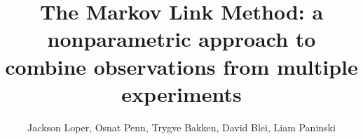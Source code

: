 



\DeclareMathOperator*{\tr}{tr}

\newcommand{\UN}[1]{\ensuremath{\left|#1\right|_\infty}}
\newcommand{\TV}[1]{\ensuremath{\left\Vert #1\right\Vert_{TV}}}
\newcommand{\EN}[1]{\ensuremath{\left|#1\right|}}
\newcommand{\kldiv}[2]{\ensuremath{D\left(#1||#2\right)}}

\newcommand{\figgygr}[2]{\texttt{[image: \#2]}}
\newcommand{\figgygrs}[3]{\begin{tabular}{c}\texttt{[image: \#2]}\\#3\end{tabular}}
\newcommand{\figgygrsTable}[3]{\begin{tabular}{c}{#2}\\#3\end{tabular}}
\newcommand{\figgygrsH}[3]{\begin{tabular}{c}\texttt{[image: \#2]}\\#3\end{tabular}}




\newcommand{\figgy}[1]{\begin{figure}\fbox{\begin{minipage}{\textwidth}#1\end{minipage}}\end{figure}}

\usepackage{cancel}


\title{The Markov Link Method: a nonparametric approach to combine observations from multiple experiments}
\author{Jackson Loper, Osnat Penn, Trygve Bakken, David Blei, Liam Paninski}

